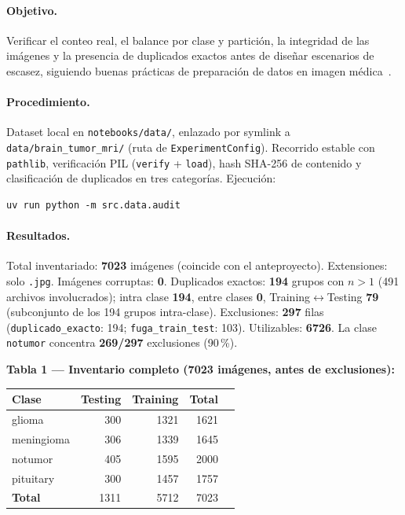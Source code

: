 \paragraph{Objetivo.}
Verificar el conteo real, el balance por clase y partición, la integridad de las
imágenes y la presencia de duplicados exactos antes de diseñar escenarios de
escasez, siguiendo buenas prácticas de preparación de datos en imagen médica~\cite{willemink2020preparing}.

\paragraph{Procedimiento.}
Dataset local en \texttt{notebooks/data/}, enlazado por symlink a
\texttt{data/brain\_tumor\_mri/} (ruta de \texttt{ExperimentConfig}).
Recorrido estable con \texttt{pathlib}, verificación PIL (\texttt{verify} +
\texttt{load}), hash SHA-256 de contenido y clasificación de duplicados en tres
categorías. Ejecución:
\begin{verbatim}
uv run python -m src.data.audit
\end{verbatim}

\paragraph{Resultados.}
Total inventariado: \textbf{7023} imágenes (coincide con el anteproyecto).
Extensiones: solo \texttt{.jpg}. Imágenes corruptas: \textbf{0}.
Duplicados exactos: \textbf{194} grupos con $n>1$ (491 archivos involucrados);
intra clase \textbf{194}, entre clases \textbf{0}, Training$\leftrightarrow$Testing
\textbf{79} (subconjunto de los 194 grupos intra-clase).
Exclusiones: \textbf{297} filas (\texttt{duplicado\_exacto}: 194;
\texttt{fuga\_train\_test}: 103). Utilizables: \textbf{6726}.
La clase \texttt{notumor} concentra \textbf{269/297} exclusiones (90\,\%).

\textbf{Tabla 1 --- Inventario completo (7023 imágenes, antes de exclusiones):}
\begin{center}
\begin{tabular}{lrrrr}\hline
\textbf{Clase} & \textbf{Testing} & \textbf{Training} & \textbf{Total} \\\hline
glioma       & 300 & 1321 & 1621 \\
meningioma   & 306 & 1339 & 1645 \\
notumor      & 405 & 1595 & 2000 \\
pituitary    & 300 & 1457 & 1757 \\\hline
\textbf{Total} & 1311 & 5712 & 7023 \\\hline
\end{tabular}
\end{center}

